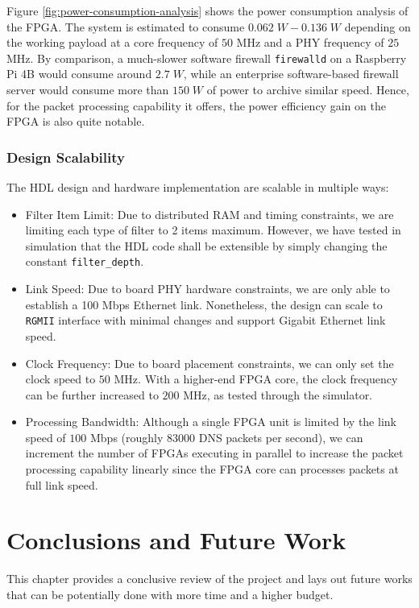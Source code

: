 \documentclass[a4paper]{report}
\newcommand{\code}{\texttt}
\begin{document}
Figure \ref{fig:power-consumption-analysis} shows the power consumption analysis of the FPGA. The system is estimated to consume $0.062\;W - 0.136\;W$ depending on the working payload at a core frequency of $50$ MHz and a PHY frequency of $25$ MHz. By comparison, a much-slower software firewall \code{firewalld} on a Raspberry Pi 4B would consume around $2.7 \; W$, while an enterprise software-based firewall server would consume more than $150 \; W$ of power to archive similar speed. Hence, for the packet processing capability it offers, the power efficiency gain on the FPGA is also quite notable.

\subsection{Design Scalability}

The HDL design and hardware implementation are scalable in multiple ways:

\begin{itemize}
    \item Filter Item Limit: Due to distributed RAM and timing constraints, we are limiting each type of filter to 2 items maximum. However, we have tested in simulation that the HDL code shall be extensible by simply changing the constant \code{filter\_depth}.
    \item Link Speed: Due to board PHY hardware constraints, we are only able to establish a 100 Mbps Ethernet link. Nonetheless, the design can scale to \code{RGMII} interface with minimal changes and support Gigabit Ethernet link speed.
    \item Clock Frequency: Due to board placement constraints, we can only set the clock speed to $50$ MHz. With a higher-end FPGA core, the clock frequency can be further increased to $200$ MHz, as tested through the simulator.
    \item Processing Bandwidth: Although a single FPGA unit is limited by the link speed of $100$ Mbps (roughly $83000$ DNS packets per second), we can increment the number of FPGAs executing in parallel to increase the packet processing capability linearly since the FPGA core can processes packets at full link speed.
\end{itemize}

\chapter{Conclusions and Future Work}

This chapter provides a conclusive review of the project and lays out future works that can be potentially done with more time and a higher budget.
\end{document}
